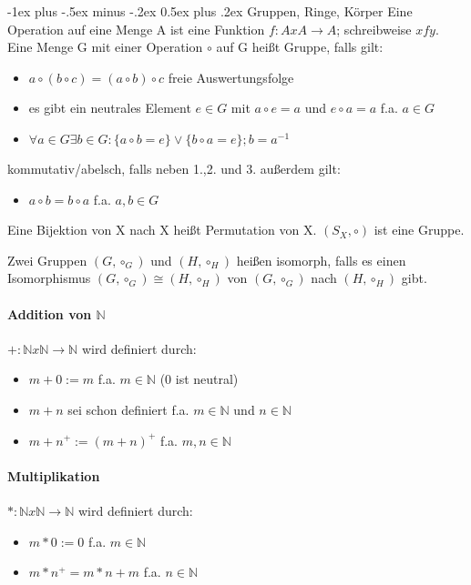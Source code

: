 \documentclass[10pt,landscape]{article}
\makeatletter
\renewcommand{\section}{\@startsection{section}{1}{0mm}%
                                {-1ex plus -.5ex minus -.2ex}%
                                {0.5ex plus .2ex}%
                                {\normalfont\large\bfseries}}
\makeatother
\begin{document}
\begin{multicols}{3}
\section{Gruppen, Ringe, Körper}
Eine Operation auf eine Menge A ist eine Funktion $f:AxA\rightarrow A$; schreibweise $xfy$. Eine Menge G mit einer Operation $\circ$ auf G heißt Gruppe, falls gilt:
\begin{itemize}
    \item $a\circ (b\circ c) = (a\circ b)\circ c$ freie Auswertungsfolge
    \item es gibt ein neutrales Element $e\in G$ mit $a\circ e=a$ und $e\circ a=a$ f.a. $a\in G$
    \item $\forall a\in G \exists b\in G: \{a\circ b=e\} \vee \{b\circ a=e\}; b=a^{-1}$
\end{itemize}
kommutativ/abelsch, falls neben 1.,2. und 3. außerdem gilt:
\begin{itemize}
    \item $a\circ b = b\circ a$ f.a. $a,b \in G$
\end{itemize}
Eine Bijektion von X nach X heißt Permutation von X. $(S_X, \circ)$ ist eine Gruppe.

Zwei Gruppen $(G, \circ_G)$ und $(H,\circ_H)$ heißen isomorph, falls es einen Isomorphismus $(G,\circ_G)\cong (H,\circ_H)$ von $(G,\circ_G)$ nach $(H,\circ_H)$ gibt.

\paragraph{Addition von $\mathbb{N}$}
$+: \mathbb{N} x \mathbb{N} \rightarrow \mathbb{N}$ wird definiert durch:
\begin{itemize}
    \item $m+0:=m$ f.a. $m\in \mathbb{N}$ (0 ist neutral)
    \item $m+n$ sei schon definiert f.a. $m\in \mathbb{N}$ und $n\in \mathbb{N}$
    \item $m+n^+:=(m+n)^+$ f.a. $m,n \in \mathbb{N}$
\end{itemize}

\paragraph{Multiplikation}
$*: \mathbb{N} x \mathbb{N} \rightarrow \mathbb{N}$ wird definiert durch:
\begin{itemize}
    \item $m*0:=0$ f.a. $m\in \mathbb{N}$
    \item $m*n^+=m*n+m$ f.a. $n\in\mathbb{N}$
\end{itemize}


\end{multicols}
\end{document}
